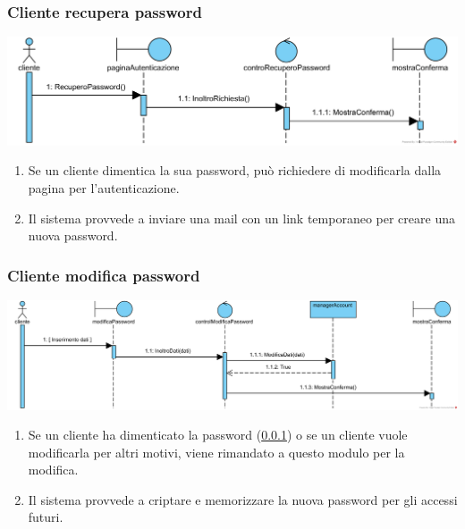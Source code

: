 \documentclass[12pt,a4paper]{article}
\begin{document}
\subsubsection{Cliente recupera password}
\label{SD:recuperopw}

\begin{center}
\includegraphics[width=\textwidth]{SequenceDiagram/ClientePasswordRecupero}
\end{center}

\begin{enumerate}
\item Se un cliente dimentica la sua password, può richiedere di modificarla dalla pagina per l'autenticazione.
\item Il sistema provvede a inviare una mail con un link temporaneo per creare una nuova password.
\end{enumerate}

\subsubsection{Cliente modifica password}
\label{SD:modificapw}

\begin{center}
\includegraphics[width=\textwidth]{SequenceDiagram/ClientePasswordModifica}
\end{center}

\begin{enumerate}
\item Se un cliente ha dimenticato la password (\ref{SD:recuperopw}) o se un cliente vuole modificarla per altri motivi, viene rimandato a questo modulo per la modifica.
\item Il sistema provvede a criptare e memorizzare la nuova password per gli accessi futuri.
\end{enumerate}
\end{document}
